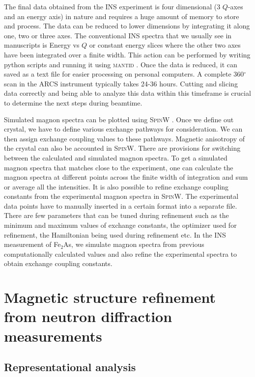 \documentclass[10pt,doublespacing,edeposit]{uiucthesis2020}
\begin{document}
\begin{mainmatter}
The final data obtained from the INS experiment is four dimensional (3 $Q$-axes and an energy axis) in nature and requires a huge amount of memory to store and process. The data can be reduced to lower dimensions by integrating it along one, two or three axes. The conventional INS spectra that we usually see in manuscripts is Energy vs $Q$ or constant energy slices where the other two axes have been integrated over a finite width. This action can be performed by writing python scripts and running it using \textsc{mantid} \cite{Arnold2014}. Once the data is reduced, it can saved as a text file for easier processing on personal computers. A complete 360$^\circ$ scan in the ARCS instrument typically takes 24-36 hours. Cutting and slicing data correctly and being able to analyze this data within this timeframe is crucial to determine the next steps during beamtime.

Simulated magnon spectra can be plotted using \textsc{SpinW} \cite{Toth_2015}. Once we define out crystal, we have to define various exchange pathways for consideration. We can then assign exchange coupling values to these pathways. Magnetic anisotropy of the crystal can also be accounted in \textsc{SpinW}. There are provisions for switching between the calculated and simulated magnon spectra. To get a simulated magnon spectra that matches close to the experiment, one can calculate the magnon spectra at different points across the finite width of integration and sum or average all the intensities. It is also possible to refine exchange coupling constants from the experimental magnon spectra in \textsc{SpinW}. The experimental data points have to manually inserted in a certain format into a separate file. There are few parameters that can be tuned during refinement such as the minimum and maximum values of exchange constants, the optimizer used for refinement, the Hamiltonian being used during refinement etc. In the INS measurement of Fe$_2$As, we simulate magnon spectra from previous computationally calculated values and also refine the experimental spectra to obtain exchange coupling constants.




\chapter{Magnetic structure refinement from neutron diffraction measurements}

\section{Representational analysis}


\end{mainmatter}
\end{document}
